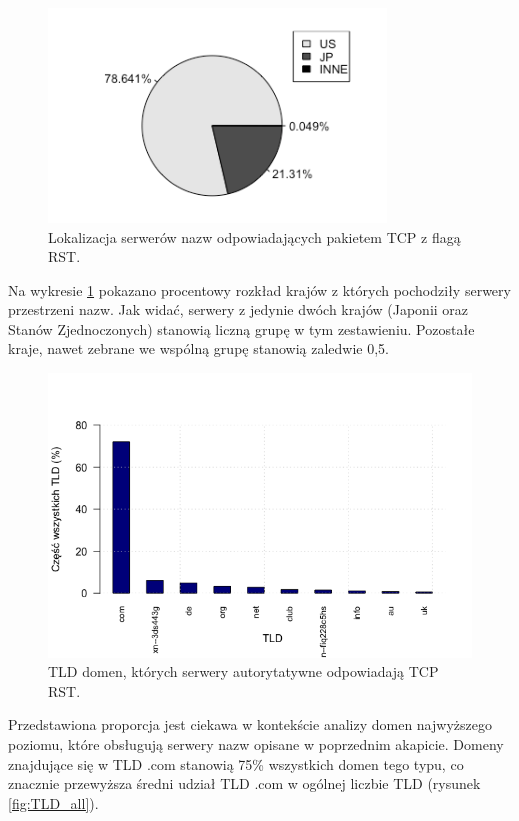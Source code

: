 \begin{figure}[h!]
\centering
\includegraphics[width=0.8\textwidth]{image/unused_pie_no_title}
\caption{Lokalizacja serwerów nazw odpowiadających pakietem TCP z flagą RST.}
\label{fig:unused_pie}
\end{figure}

Na wykresie \ref{fig:unused_pie} pokazano procentowy rozkład krajów z których pochodziły serwery przestrzeni nazw. Jak widać,
serwery z jedynie dwóch krajów (Japonii oraz Stanów Zjednoczonych) stanowią liczną grupę w tym zestawieniu. Pozostałe kraje, nawet
zebrane we wspólną grupę stanowią zaledwie 0,5\textperthousand.

\begin{figure}[h!]
\centering
\includegraphics[width=1.0\textwidth]{image/unused_tld}
\caption{TLD domen, których serwery autorytatywne odpowiadają TCP RST.}
\label{fig:unused_tld}
\end{figure}

Przedstawiona proporcja jest ciekawa w kontekście analizy domen najwyższego poziomu, które obsługują serwery nazw opisane
w poprzednim akapicie. Domeny znajdujące się w TLD .com stanowią 75\% wszystkich domen tego typu, co znacznie przewyższa średni udział
TLD .com w ogólnej liczbie TLD (rysunek \ref{fig:TLD_all}).

